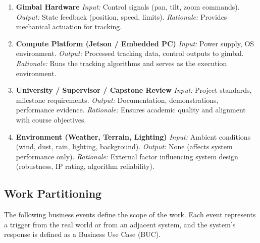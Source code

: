 \documentclass[12pt]{article}
\begin{document}
\begin{enumerate}[wide=0pt, leftmargin=*]
  \item \textbf{Gimbal Hardware}
        \emph{Input:} Control signals (pan, tilt, zoom commands).
        \emph{Output:} State feedback (position, speed, limits).
        \emph{Rationale:} Provides mechanical actuation for tracking.

  \item \textbf{Compute Platform (Jetson / Embedded PC)}
        \emph{Input:} Power supply, OS environment.
        \emph{Output:} Processed tracking data, control outputs to gimbal.
        \emph{Rationale:} Runs the tracking algorithms and serves as the
        execution environment.

  \item \textbf{University / Supervisor / Capstone Review}
        \emph{Input:} Project standards, milestone requirements.
        \emph{Output:} Documentation, demonstrations, performance evidence.
        \emph{Rationale:} Ensures academic quality and alignment with course
        objectives.

  \item \textbf{Environment (Weather, Terrain, Lighting)}
        \emph{Input:} Ambient conditions (wind, dust, rain, lighting,
        background).
        \emph{Output:} None (affects system performance only).
        \emph{Rationale:} External factor influencing system design
        (robustness, IP rating, algorithm reliability).
\end{enumerate}

\subsection{Work Partitioning}

The following business events define the scope of the work. Each event
represents a trigger from the real world or from an adjacent system, and the
system’s response is defined as a Business Use Case (BUC).
\end{document}
